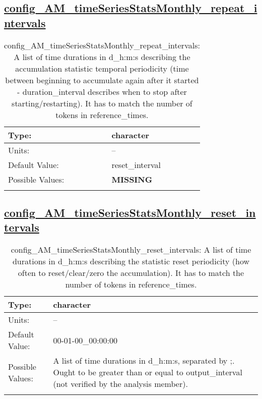 \subsection[config\_AM\_timeSeriesStatsMonthly\_repeat\_intervals]{\hyperref[sec:nm_tab_AM_timeSeriesStatsMonthly]{config\_AM\_timeSeriesStatsMonthly\_repeat\_intervals}}
\label{subsec:nm_sec_config_AM_timeSeriesStatsMonthly_repeat_intervals}
\begin{center}
\begin{longtable}{| p{2.0in} || p{4.0in} |}
    \hline
    Type: & character \\
    \hline
    Units: & -- \\
    \hline
    Default Value: & reset\_interval \\
    \hline
    Possible Values: & {\bf \color{red} MISSING} \\
    \hline
    \caption{config\_AM\_timeSeriesStatsMonthly\_repeat\_intervals: A list of time durations in d\_h:m:s describing the accumulation statistic temporal periodicity (time between beginning to accumulate again after it started - duration\_interval describes when to stop after starting/restarting). It has to match the number of tokens in reference\_times.}
\end{longtable}
\end{center}
\subsection[config\_AM\_timeSeriesStatsMonthly\_reset\_intervals]{\hyperref[sec:nm_tab_AM_timeSeriesStatsMonthly]{config\_AM\_timeSeriesStatsMonthly\_reset\_intervals}}
\label{subsec:nm_sec_config_AM_timeSeriesStatsMonthly_reset_intervals}
\begin{center}
\begin{longtable}{| p{2.0in} || p{4.0in} |}
    \hline
    Type: & character \\
    \hline
    Units: & -- \\
    \hline
    Default Value: & 00-01-00\_00:00:00 \\
    \hline
    Possible Values: & A list of time durations in d\_h:m:s, separated by ;. Ought to be greater than or equal to output\_interval (not verified by the analysis member). \\
    \hline
    \caption{config\_AM\_timeSeriesStatsMonthly\_reset\_intervals: A list of time durations in d\_h:m:s describing the statistic reset periodicity (how often to reset/clear/zero the accumulation). It has to match the number of tokens in reference\_times.}
\end{longtable}
\end{center}
